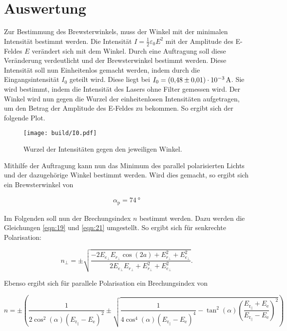 %

%
\section{Auswertung}
\label{sec:Auswertung}

Zur Bestimmung des Brewsterwinkels, muss der Winkel mit der minimalen Intensität bestimmt werden. 
Die Intensität $I=\frac1 2 \varepsilon_0 E^2$ mit der Amplitude des E-Feldes $E$ verändert sich mit dem Winkel. 
Durch eine Auftragung soll diese Veränderung verdeutlicht und der Brewsterwinkel bestimmt werden. 
Diese Intensität soll nun Einheitenlos gemacht werden, indem durch die Eingangsintensität $I_0$ geteilt wird. 
Diese liegt bei $I_0=\qty{0.48\pm0.01e-3}{\ampere}$. Sie wird bestimmt, indem die Intensität des Lasers ohne 
Filter gemessen wird. 
Der Winkel wird nun gegen die Wurzel der einheitenlosen Intensitäten aufgetragen, um den Betrag der Amplitude des E-Feldes zu bekommen. 
So ergibt sich der folgende Plot.

\begin{figure}
    \centering
    \texttt{[image: build/I0.pdf]}
    \caption{Wurzel der Intensitäten gegen den jeweiligen Winkel.}
\end{figure}

\noindent Mithilfe der Auftragung kann nun das Minimum des parallel polarisierten Lichts und der dazugehörige Winkel bestimmt werden. 
Wird dies gemacht, so ergibt sich ein Brewsterwinkel von 

\begin{align}
    \alpha_\text{p} = \qty{74}{\degree}
\end{align}

\noindent Im Folgenden soll nun der Brechungsindex $n$ bestimmt werden. Dazu werden die Gleichungen \eqref{eqn:19} und \eqref{eqn:21} umgestellt. 
So ergibt sich für senkrechte Polarisation:

\begin{equation}
    n_\bot = \pm\sqrt{\frac{-2 E_{e_\bot} E_{r_\bot} \cos{(2a)} + E_{r_\bot}^2 + E_{e_\bot}^2 }{ 2 E_{e_\bot} E_{r_\bot} + E_{r_\bot}^2 + E_{e_\bot}^2  }}.
\end{equation}

\noindent Ebenso ergibt sich für parallele Polarisation ein Brechungsindex von 

\begin{equation}
    n = \pm \left( \frac{1}{2 \cos^2(\alpha) (E_{\text{r}_\parallel} - E_\text{e})^2} \pm \sqrt{\frac{1}{4 \cos^4(\alpha) (E_{\text{r}_\parallel} - E_\text{e})^4} - \tan^2(\alpha) \left(\frac{E_{\text{r}_\parallel} + E_\text{e}}{E_{\text{r}_\parallel} - E_\text{e}} \right)^2} \right)
\end{equation}

